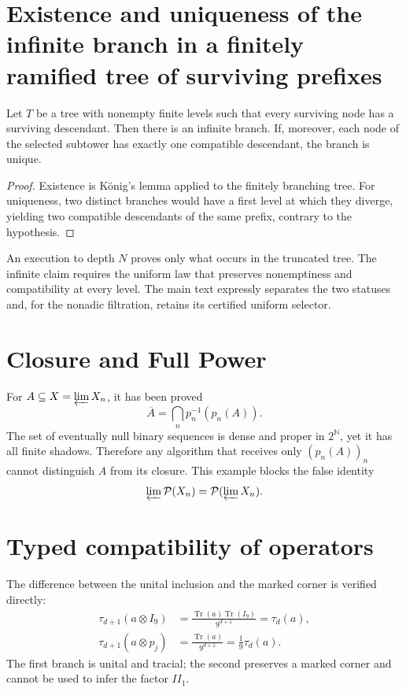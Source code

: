 \section{Existence and uniqueness of the infinite branch in a finitely ramified tree of surviving prefixes}

\begin{lemma}
Let \(T\) be a tree with nonempty finite levels such that every
surviving node has a surviving descendant. Then there is an infinite
branch. If, moreover, each node of the selected subtower has exactly
one compatible descendant, the branch is unique.
\end{lemma}

\begin{proof}
Existence is König's lemma applied to the finitely branching tree.
For uniqueness, two distinct branches would have a first level at which they
diverge, yielding two compatible descendants of the same prefix, contrary to the
hypothesis.
\end{proof}

\begin{controlbox}
An execution to depth \(N\) proves only what occurs in the
truncated tree. The infinite claim requires the uniform law that preserves
nonemptiness and compatibility at every level. The main text expressly separates
the two statuses and, for the nonadic filtration, retains its certified uniform
selector.
\end{controlbox}

\section{Closure and Full Power}

For \(A\subseteq X=\varprojlim X_n\), it has been proved
\[
 \overline A=\bigcap_n p_n^{-1}(p_n(A)).
\]
The set of eventually null binary sequences is dense and proper in
\(2^{\mathbb N}\), yet it has all finite shadows. Therefore any
algorithm that receives only \((p_n(A))_n\) cannot distinguish \(A\) from its
closure. This example blocks the false identity
\[
 \varprojlim\mathcal P(X_n)=\mathcal P(\varprojlim X_n).
\]

\section{Typed compatibility of operators}

The difference between the unital inclusion and the marked corner is verified directly:
\[
\begin{aligned}
 \tau_{d+1}(a\otimes I_9)
 &=\frac{\operatorname{Tr}(a)\operatorname{Tr}(I_9)}{9^{d+1}}
 =\tau_d(a),\\
 \tau_{d+1}(a\otimes p_j)
 &=\frac{\operatorname{Tr}(a)}{9^{d+1}}
 =\frac1{9}\tau_d(a).
\end{aligned}
\]
The first branch is unital and tracial; the second preserves a marked corner
and cannot be used to infer the factor \(II_1\).

